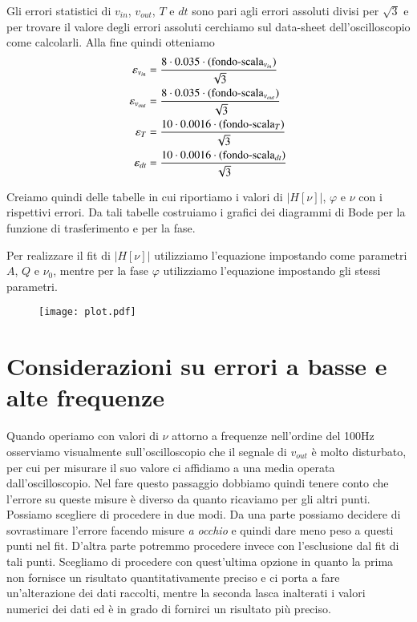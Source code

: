 \documentclass[
    rmp,
    floatfix,
    reprint, 
    superscriptaddress, 
    altaffilletter, 
    amsmath, 
    amssymb, 
    a4paper]{revtex4-2}
\begin{document}
Gli errori statistici di $v_{in}$, $v_{out}$, $T$ e $dt$ sono pari agli errori assoluti divisi per $\sqrt{3}$ e per trovare il valore degli errori assoluti cerchiamo sul data-sheet dell'oscilloscopio come calcolarli. Alla fine quindi otteniamo
\begin{subequations}
    \begin{align}
        \varepsilon_{v_{in}}  &= \frac{8  \cdot 0.035  \cdot (\text{fondo-scala}_{v_{in}} )}{\sqrt{3}} \\
        \varepsilon_{v_{out}} &= \frac{8  \cdot 0.035  \cdot (\text{fondo-scala}_{v_{out}})}{\sqrt{3}} \\
        \varepsilon_{T}       &= \frac{10 \cdot 0.0016 \cdot (\text{fondo-scala}_{T}      )}{\sqrt{3}} \\
        \varepsilon_{dt}      &= \frac{10 \cdot 0.0016 \cdot (\text{fondo-scala}_{dt}     )}{\sqrt{3}}
    \end{align}
\end{subequations}


Creiamo quindi delle tabelle in cui riportiamo i valori di $\big|H[\nu]\big|$, $\varphi$ e $\nu$ con i rispettivi errori. Da tali tabelle costruiamo i grafici dei diagrammi di Bode per la funzione di trasferimento e per la fase. 

Per realizzare il fit di $\big|H[\nu]\big|$ utilizziamo l'equazione  impostando come parametri $A$, $Q$ e $\nu_{0}$, mentre per la fase $\varphi$ utilizziamo l'equazione  impostando gli stessi parametri.  
\begin{figure*}
    \texttt{[image: plot.pdf]}
    \caption{}
    \label{fig:plot}
\end{figure*}

\section*{Considerazioni su errori a basse e alte frequenze}
Quando operiamo con valori di $\nu$ attorno a frequenze nell'ordine del 100Hz osserviamo visualmente sull'oscilloscopio che il segnale di $v_{out}$ è molto disturbato, per cui per misurare il suo valore ci affidiamo a una media operata dall'oscilloscopio. Nel fare questo passaggio dobbiamo quindi tenere conto che l'errore su queste misure è diverso da quanto ricaviamo per gli altri punti. Possiamo scegliere di procedere in due modi. Da una parte possiamo decidere di sovrastimare l'errore facendo misure \textit{a occhio} e quindi dare meno peso a questi punti nel fit. D'altra parte potremmo procedere invece con l'esclusione dal fit di tali punti. Scegliamo di procedere con quest'ultima opzione in quanto la prima non fornisce un risultato quantitativamente preciso e ci porta a fare un'alterazione dei dati raccolti, mentre la seconda lasca inalterati i valori numerici dei dati ed è in grado di fornirci un risultato più preciso. 
\end{document}
